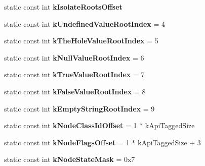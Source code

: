 \begin{DoxyCompactItemize}
static const int {\bfseries k\+Isolate\+Roots\+Offset}
\item 
\mbox{\label{classv8_1_1internal_1_1Internals_a7281ff0eafed559e64613465b1a03296}} 
static const int {\bfseries k\+Undefined\+Value\+Root\+Index} = 4
\item 
\mbox{\label{classv8_1_1internal_1_1Internals_ac07a35d3efef0c107062b3eb88696e31}} 
static const int {\bfseries k\+The\+Hole\+Value\+Root\+Index} = 5
\item 
\mbox{\label{classv8_1_1internal_1_1Internals_ab311cf753ec5c968052bd83ef21e83f8}} 
static const int {\bfseries k\+Null\+Value\+Root\+Index} = 6
\item 
\mbox{\label{classv8_1_1internal_1_1Internals_a93abd58b178eca469bade28e68b5c59e}} 
static const int {\bfseries k\+True\+Value\+Root\+Index} = 7
\item 
\mbox{\label{classv8_1_1internal_1_1Internals_a90b6837aa368bbe4ffd914e6f753b167}} 
static const int {\bfseries k\+False\+Value\+Root\+Index} = 8
\item 
\mbox{\label{classv8_1_1internal_1_1Internals_a6f669f3d98fe653b281b26be3bc0655a}} 
static const int {\bfseries k\+Empty\+String\+Root\+Index} = 9
\item 
\mbox{\label{classv8_1_1internal_1_1Internals_af4fb6d499cb87f03031ad4d6be6bcd8f}} 
static const int {\bfseries k\+Node\+Class\+Id\+Offset} = 1 $\ast$ k\+Api\+Tagged\+Size
\item 
\mbox{\label{classv8_1_1internal_1_1Internals_aee5606f2a44d43d8dafe344e0bb753ef}} 
static const int {\bfseries k\+Node\+Flags\+Offset} = 1 $\ast$ k\+Api\+Tagged\+Size + 3
\item 
\mbox{\label{classv8_1_1internal_1_1Internals_a853acc088978d38a5a69091cf857a46d}} 
static const int {\bfseries k\+Node\+State\+Mask} = 0x7
\item 

\end{DoxyCompactItemize}
